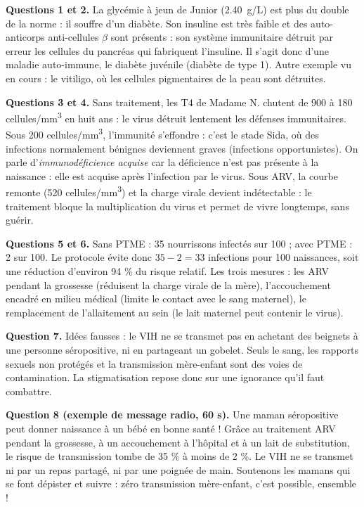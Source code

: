 \documentclass[11pt]{article}
\newcommand{\cle}[1]{{\popxbold\color{popdark}#1}}
\newcounter{popsec}
\newcounter{popsub}
\newcommand{\courssub}[1]{%
  \stepcounter{popsub}%
  \par\vspace{9pt}\noindent{\popxbold\fontsize{11.5}{13}\selectfont\color{popink}{\color{poporange}\thepopsec.\thepopsub}\hspace{6pt}#1}\par\nopagebreak\vspace{4pt}
}
\begin{document}
\courssub{Démarche et corrigé commenté}

\begin{exoresolu}
\textbf{Questions 1 et 2.} La glycémie à jeun de Junior (\SI{2,40}{g/L}) est plus du double de la norme : il souffre d'un diabète. Son insuline est très faible et des auto-anticorps anti-cellules $\beta$ sont présents : son système immunitaire détruit par erreur les cellules du pancréas qui fabriquent l'insuline. Il s'agit donc d'une \cle{maladie auto-immune}, le diabète juvénile (diabète de type 1). Autre exemple vu en cours : le vitiligo, où les cellules pigmentaires de la peau sont détruites.

\tcblower

\textbf{Questions 3 et 4.} Sans traitement, les T4 de Madame N. chutent de 900 à 180 cellules/mm\textsuperscript{3} en huit ans : le virus détruit lentement les défenses immunitaires. Sous 200 cellules/mm\textsuperscript{3}, l'immunité s'effondre : c'est le stade Sida, où des infections normalement bénignes deviennent graves (infections opportunistes). On parle d'\emph{immunodéficience acquise} car la déficience n'est pas présente à la naissance : elle est acquise après l'infection par le virus. Sous ARV, la courbe remonte (520 cellules/mm\textsuperscript{3}) et la charge virale devient indétectable : le traitement bloque la multiplication du virus et permet de vivre longtemps, sans guérir.

\textbf{Questions 5 et 6.} Sans PTME : 35 nourrissons infectés sur 100 ; avec PTME : 2 sur 100. Le protocole évite donc $35 - 2 = 33$ infections pour 100 naissances, soit une réduction d'environ 94 \% du risque relatif. Les trois mesures : les ARV pendant la grossesse (réduisent la charge virale de la mère), l'accouchement encadré en milieu médical (limite le contact avec le sang maternel), le remplacement de l'allaitement au sein (le lait maternel peut contenir le virus).

\textbf{Question 7.} Idées fausses : le VIH ne se transmet pas en achetant des beignets à une personne séropositive, ni en partageant un gobelet. Seuls le sang, les rapports sexuels non protégés et la transmission mère-enfant sont des voies de contamination. La stigmatisation repose donc sur une ignorance qu'il faut combattre.

\textbf{Question 8 (exemple de message radio, 60 s).} \og Une maman séropositive peut donner naissance à un bébé en bonne santé ! Grâce au traitement ARV pendant la grossesse, à un accouchement à l'hôpital et à un lait de substitution, le risque de transmission tombe de 35 \% à moins de 2 \%. Le VIH ne se transmet ni par un repas partagé, ni par une poignée de main. Soutenons les mamans qui se font dépister et suivre : zéro transmission mère-enfant, c'est possible, ensemble ! \fg
\end{exoresolu}
\end{document}
